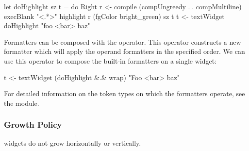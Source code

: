 \begin{haskellcode}
 let doHighlight sz t = do
   Right r <- compile (compUngreedy .|. compMultiline) execBlank "<.*>"
   highlight r (fgColor bright_green) sz t
 t <- textWidget doHighlight "foo <bar> baz"
\end{haskellcode}

Formatters can be composed with the  operator.  This
operator constructs a new formatter which will apply the operand
formatters in the specified order.  We can use this operator to
compose the built-in formatters on a single  widget:

\begin{haskellcode}
 t <- textWidget (doHighlight &.& wrap) "Foo <bar> baz"
\end{haskellcode}

For detailed information on the token types on which the formatters
operate, see the  module.

\subsubsection{Growth Policy}

 widgets do not grow horizontally or vertically.
